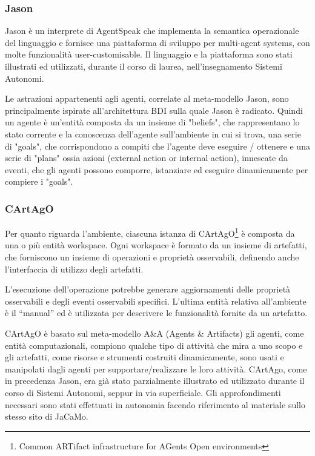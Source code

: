 \subsubsection*{Jason} \label{jason}

Jason è un interprete di AgentSpeak che implementa la semantica operazionale del linguaggio e fornisce una piattaforma di sviluppo per multi-agent systems, con molte funzionalità user-customisable. Il linguaggio e la piattaforma sono stati illustrati ed utilizzati, durante il corso di laurea, nell'insegnamento Sistemi Autonomi. 

\medskip

Le astrazioni appartenenti agli agenti, correlate al meta-modello Jason, sono principalmente ispirate all'architettura BDI sulla quale Jason è radicato. Quindi un agente è un'entità composta da un insieme di "beliefs", che rappresentano lo stato corrente e la conoscenza dell'agente sull'ambiente in cui si trova, una serie di "goals", che corrispondono a compiti che l'agente deve eseguire / ottenere e una serie di "plans" ossia azioni (external action or internal action), innescate da eventi, che gli agenti possono comporre, istanziare ed eseguire dinamicamente per compiere i "goals".\cite{jason-book}

\subsubsection*{CArtAgO}
Per quanto riguarda l'ambiente, ciascuna istanza di CArtAgO\footnote{Common ARTifact infrastructure for AGents Open environments} è composta da una o più entità workspace. Ogni workspace è formato da un insieme di artefatti, che forniscono un insieme di operazioni e proprietà osservabili, definendo anche l'interfaccia di utilizzo degli artefatti.

\medskip

L'esecuzione dell'operazione potrebbe generare aggiornamenti delle proprietà osservabili e degli eventi osservabili specifici. L'ultima entità relativa all'ambiente è il “manual” ed è utilizzata per descrivere le funzionalità fornite da un artefatto.

\medskip

CArtAgO è basato sul meta-modello A\&A (Agents \& Artifacts) gli agenti, come entità computazionali, compiono qualche tipo di attività che mira a uno scopo e gli artefatti, come risorse e strumenti costruiti dinamicamente, sono usati e manipolati dagli agenti per supportare/realizzare le loro attività\cite{cartago}. CArtAgo, come in precedenza Jason, era già stato parzialmente illustrato ed utilizzato durante il corso di Sistemi Autonomi, seppur in via superficiale. Gli approfondimenti necessari sono stati effettuati in autonomia facendo riferimento al materiale sullo stesso sito di JaCaMo.

